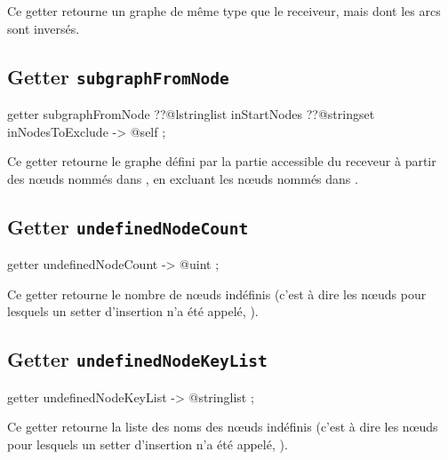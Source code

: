 Ce getter retourne un graphe de même type que le receiveur, mais dont les arcs sont inversés.





\subsection{Getter \texttt{subgraphFromNode}}

\begin{galgascode}
getter subgraphFromNode
  ??@lstringlist inStartNodes
  ??@stringset inNodesToExclude
  -> @self ;
\end{galgascode}

Ce getter retourne le graphe défini par la partie accessible du receveur à partir des nœuds nommés dans , en excluant les nœuds nommés dans .






\subsection{Getter \texttt{undefinedNodeCount}}

\begin{galgascode}
getter undefinedNodeCount -> @uint ;
\end{galgascode}

Ce getter retourne le nombre de nœuds indéfinis (c'est à dire les nœuds pour lesquels un setter d'insertion n'a été appelé, ).







\subsection{Getter \texttt{undefinedNodeKeyList}}

\begin{galgascode}
getter undefinedNodeKeyList -> @stringlist ;
\end{galgascode}

Ce getter retourne la liste des noms des nœuds indéfinis (c'est à dire les nœuds pour lesquels un setter d'insertion n'a été appelé, ).








